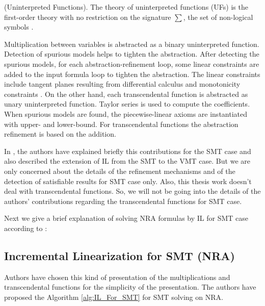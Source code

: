 \begin{definition}
    (Uninterpreted Functions).
    The theory of uninterpreted functions (UFs) is the first-order theory with no restriction on the signature $\sum$, the set of non-logical symbols \cite{Cimatti:2018:ILS:3274693.3230639}.
 \end{definition}
 
\noindent Multiplication between variables is abstracted as a binary uninterpreted function.
Detection of spurious models helps to tighten the abstraction.
After detecting the spurious models, for each abstraction-refinement loop, some linear constraints are added to the input formula loop to tighten the abstraction.
The linear constraints include tangent planes resulting from differential calculus and monotonicity constraints \cite{Cimatti:2018:ILS:3274693.3230639}.
On the other hand, each transcendental function is abstracted as unary uninterpreted function.
Taylor series is used to compute the coefficients.
When spurious models are found, the  piecewise-linear axioms are instantiated with upper- and lower-bound.
For transcendental functions the abstraction refinement is based on the addition.\newline

\noindent In \cite{Cimatti:2018:ILS:3274693.3230639}, the authors have explained briefly this contributions for the SMT case and also described the extension of IL from the SMT to the VMT case. 
But we are only concerned about the details of the refinement mechanisms and of the detection of satisfiable results for SMT case only.
Also, this thesis work doesn't deal with transcendental functions.
So, we will not be going into the details of the authors' contributions regarding the transcendental functions for SMT case.

\noindent Next we give a brief explanation of solving NRA formulas by IL for SMT case according to \cite{Cimatti:2018:ILS:3274693.3230639}:
\subsection{Incremental Linearization for SMT (NRA)}
\label{subsec:IL_For_SMT}
Authors have chosen this kind of presentation of the multiplications and transcendental functions for the simplicity of the presentation.
The authors have proposed the Algorithm \ref{alg:IL_For_SMT} for SMT solving on NRA.\newline

